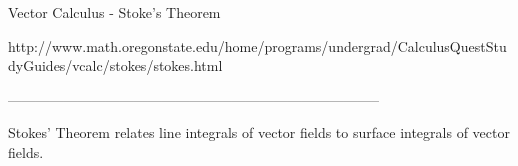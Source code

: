 
Vector Calculus - Stoke's Theorem

 

http://www.math.oregonstate.edu/home/programs/undergrad/CalculusQuestStudyGuides/vcalc/stokes/stokes.html



--------------------------------------------------------------------------------

Stokes' Theorem relates line integrals of vector fields to surface integrals of vector fields.
